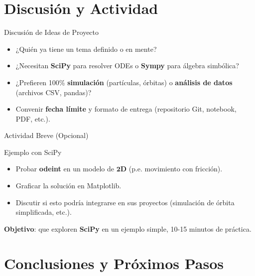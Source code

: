 \documentclass[10pt]{beamer}
\begin{document}
\section{Discusión y Actividad}

\begin{frame}{Discusión de Ideas de Proyecto}
  \begin{itemize}
    \item ¿Quién ya tiene un tema definido o en mente?
    \item ¿Necesitan \textbf{SciPy} para resolver ODEs o \textbf{Sympy} para álgebra simbólica?
    \item ¿Prefieren 100\% \textbf{simulación} (partículas, órbitas) o \textbf{análisis de datos} (archivos CSV, pandas)?
    \item Convenir \textbf{fecha límite} y formato de entrega (repositorio Git, notebook, PDF, etc.).
  \end{itemize}
\end{frame}

\begin{frame}{Actividad Breve (Opcional)}
  \begin{block}{Ejemplo con SciPy}
    \begin{itemize}
      \item Probar \textbf{odeint} en un modelo de \(\textbf{2D}\) (p.e. movimiento con fricción).
      \item Graficar la solución en Matplotlib.
      \item Discutir si esto podría integrarse en sus proyectos (simulación de órbita simplificada, etc.).
    \end{itemize}
  \end{block}
  \textbf{Objetivo}: que exploren \textbf{SciPy} en un ejemplo simple, 10-15 minutos de práctica.
\end{frame}

\section{Conclusiones y Próximos Pasos}
\end{document}
